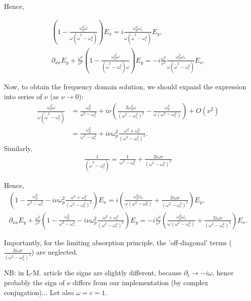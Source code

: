 \documentclass[a4paper,10pt]{article}
\begin{document}
Hence,

\begin{align*}
\left(1-\frac{\omega_p^2\tilde{\omega}}{\omega(\tilde{\omega}^2-\omega_c^2)}\right)E_x=i\frac{\omega_p^2\omega_c}{\omega(\tilde{\omega}^2-\omega_c^2)}E_y,\\
\partial_{xx} E_y+\frac{\omega^2}{c^2}\left(1-\frac{\omega_p^2\tilde{\omega}}{(\tilde{\omega}^2-\omega_c^2)\omega}\right)E_y=
-i\frac{\omega^2}{c^2}\frac{\omega_p^2 \omega_c}{\omega(\tilde{\omega}^2-\omega^2_c)}E_x.
\end{align*}

Now, to obtain the frequency domain solution, we should expand the expression into series of $\nu$ (as $\nu\rightarrow 0$):
\begin{align*}
 \frac{\omega_p^2\tilde{\omega}}{\omega(\tilde{\omega}^2-\omega_c^2)}&=
 \frac{\omega_p^2}{\omega^2-\omega_c^2}+i\nu\left(
 \frac{2\omega_p^2\omega}{(\omega^2-\omega^2_c)^2}-
 \frac{\omega_p^2}{\omega(\omega^2-\omega_c^2)}\right)+O(\nu^2)\\
 &=\frac{\omega_p^2}{\omega^2-\omega_c^2}+i\nu\omega_p^2\frac{\omega^2+\omega_c^2}{(\omega^2-\omega_c^2)^2}.
\end{align*}
Similarly,
\begin{align*}
 \frac{1}{(\tilde{\omega}^2-\omega^2_c)}=\frac{1}{\omega^2-\omega_c^2}+\frac{2i\omega\nu}{(\omega^2-\omega^2_c)^2}
\end{align*}

Hence,
\begin{align*}
\left(1-\frac{\omega_p^2}{\omega^2-\omega_c^2}-i\nu\omega_p^2\frac{\omega^2+\omega_c^2}{(\omega^2-\omega_c^2)^2}\right)E_x=
i\left(\frac{\omega_p^2\omega_c}{\omega(\omega^2-\omega_c^2)}+\frac{2i\omega\nu}{(\omega^2-\omega^2_c)^2}\right)E_y,\\
\partial_{xx} E_y+\frac{\omega^2}{c^2}
\left(1-\frac{\omega_p^2}{\omega^2-\omega_c^2}-i\nu\omega_p^2\frac{\omega^2+\omega_c^2}{(\omega^2-\omega_c^2)^2}\right)E_y=
-i\frac{\omega^2}{c^2}\left(\frac{\omega_p^2\omega_c}{\omega(\omega^2-\omega_c^2)}+\frac{2i\omega\nu}{(\omega^2-\omega^2_c)^2}\right)E_x.
\end{align*}

Importantly, for the limiting absorption principle, the 'off-diagonal' terms ($\frac{2i\omega\nu}{(\omega^2-\omega^2_c)^2}$) are neglected.


NB: in L-M. article the signs are slightly different, because $\partial_t \rightarrow -i\omega$, hence probably the sign of $\nu$ differs from our implementation (by complex conjugation)...
Let also $\omega=c=1$. 
\end{document}
